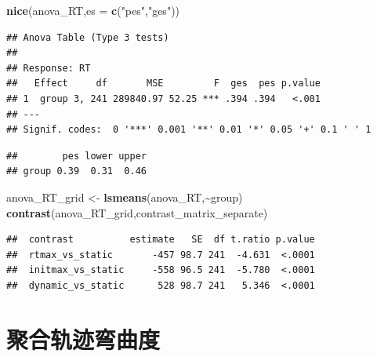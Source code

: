 \documentclass[
]{article}
\newenvironment{Shaded}{\begin{snugshade}}{\end{snugshade}}
\newcommand{\AttributeTok}[1]{\textcolor[rgb]{0.13,0.29,0.53}{#1}}
\newcommand{\DecValTok}[1]{\textcolor[rgb]{0.00,0.00,0.81}{#1}}
\newcommand{\FunctionTok}[1]{\textcolor[rgb]{0.13,0.29,0.53}{\textbf{#1}}}
\newcommand{\NormalTok}[1]{#1}
\newcommand{\OtherTok}[1]{\textcolor[rgb]{0.56,0.35,0.01}{#1}}
\newcommand{\SpecialCharTok}[1]{\textcolor[rgb]{0.81,0.36,0.00}{\textbf{#1}}}
\newcommand{\StringTok}[1]{\textcolor[rgb]{0.31,0.60,0.02}{#1}}
\begin{document}
\begin{Shaded}
\begin{Highlighting}[]
\FunctionTok{nice}\NormalTok{(anova\_RT,}\AttributeTok{es =} \FunctionTok{c}\NormalTok{(}\StringTok{"pes"}\NormalTok{,}\StringTok{"ges"}\NormalTok{))}
\end{Highlighting}
\end{Shaded}

\begin{verbatim}
## Anova Table (Type 3 tests)
## 
## Response: RT
##   Effect     df       MSE         F  ges  pes p.value
## 1  group 3, 241 289840.97 52.25 *** .394 .394   <.001
## ---
## Signif. codes:  0 '***' 0.001 '**' 0.01 '*' 0.05 '+' 0.1 ' ' 1
\end{verbatim}

\begin{Shaded}
\end{Shaded}

\begin{verbatim}
##        pes lower upper
## group 0.39  0.31  0.46
\end{verbatim}

\begin{Shaded}
\begin{Highlighting}[]
\NormalTok{anova\_RT\_grid }\OtherTok{\textless{}{-}} \FunctionTok{lsmeans}\NormalTok{(anova\_RT,}\SpecialCharTok{\textasciitilde{}}\NormalTok{group)}
\FunctionTok{contrast}\NormalTok{(anova\_RT\_grid,contrast\_matrix\_separate)}
\end{Highlighting}
\end{Shaded}

\begin{verbatim}
##  contrast          estimate   SE  df t.ratio p.value
##  rtmax_vs_static       -457 98.7 241  -4.631  <.0001
##  initmax_vs_static     -558 96.5 241  -5.780  <.0001
##  dynamic_vs_static      528 98.7 241   5.346  <.0001
\end{verbatim}

\section{聚合轨迹弯曲度}\label{ux805aux5408ux8f68ux8ff9ux5f2fux66f2ux5ea6}
\end{document}
